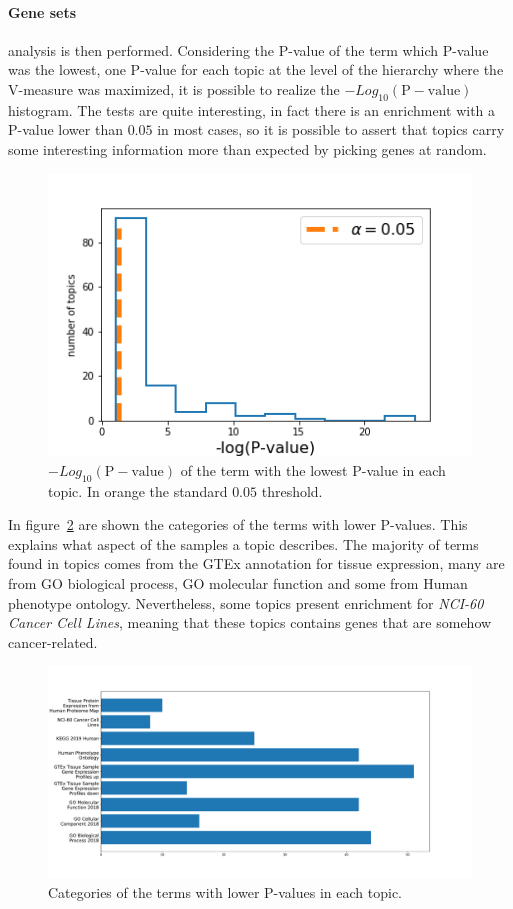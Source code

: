 \paragraph{Gene sets} analysis is then performed. Considering the P-value of the term which P-value was the lowest, one P-value for each topic at the level of the hierarchy where the V-measure was maximized, it is possible to realize the $-Log_{10}(\mathrm{P-value})$ histogram. The tests are quite interesting, in fact there is an enrichment with a P-value lower than $0.05$ in most cases, so it is possible to assert that topics carry some interesting information more than expected by picking genes at random.
\begin{figure}[htb!]
    \centering
    \includegraphics[width=0.65\linewidth]{pictures/topic/merged/pvaluescrosstopic.png}
    \caption{$-Log_{10}(\mathrm{P-value})$ of the term with the lowest P-value in each topic. In orange the standard $0.05$ threshold.}
    \label{fig:topic/merged/pvaluescrosstopic}
\end{figure}
In figure~\ref{fig:topic/merged/pvaluecategories} are shown the categories of the terms with lower P-values. This explains what aspect of the samples a topic describes. The majority of terms found in topics comes from the GTEx annotation for tissue expression, many are from GO biological process, GO molecular function and some from Human phenotype ontology. Nevertheless, some topics present enrichment for \textit{NCI-60 Cancer Cell Lines}, meaning that these topics contains genes that are somehow cancer-related.
\begin{figure}[htb!]
    \centering
    \includegraphics[width=0.8\linewidth]{pictures/topic/merged/pvaluecategories.pdf}
    \caption{Categories of the terms with lower P-values in each topic.}
    \label{fig:topic/merged/pvaluecategories}
\end{figure}

